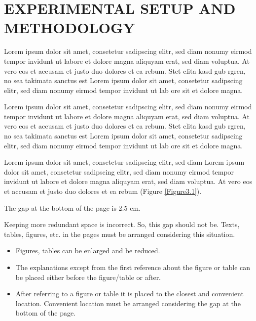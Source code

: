 \chapter{EXPERIMENTAL SETUP AND METHODOLOGY}\label{ch:Ch3}
\vspace*{-12pt} %

Lorem ipsum dolor sit amet, consetetur sadipscing elitr, sed diam nonumy eirmod tempor invidunt ut labore et dolore magna aliquyam erat, sed diam voluptua. At vero eos et accusam et justo duo dolores et ea rebum. Stet clita kasd gub rgren, no sea takimata sanctus est Lorem ipsum dolor sit amet, consetetur sadipscing elitr, sed diam nonumy eirmod tempor invidunt ut lab ore sit et dolore magna.

Lorem ipsum dolor sit amet, consetetur sadipscing elitr, sed diam nonumy eirmod tempor invidunt ut labore et dolore magna aliquyam erat, sed diam voluptua. At vero eos et accusam et justo duo dolores et ea rebum. Stet clita kasd gub rgren, no sea takimata sanctus est Lorem ipsum dolor sit amet, consetetur sadipscing elitr, sed diam nonumy eirmod tempor invidunt ut lab ore sit et dolore magna.
 

Lorem ipsum dolor sit amet, consetetur sadipscing elitr, sed diam Lorem ipsum dolor sit amet, consetetur sadipscing elitr, sed diam nonumy eirmod tempor invidunt ut labore et dolore magna aliquyam erat, sed diam voluptua. At vero eos et accusam et justo duo dolores et ea rebum (Figure \ref{Figure3.1}).

The gap at the bottom of the page is 2.5 cm. 

Keeping more redundant space is incorrect. So, this gap should not be. Texts, tables, figures, etc. in the pages must be arranged considering this situation.

\begin{itemize}
	\setlength{\itemindent}{-0.35em} %
	\item{Figures, tables can be enlarged and be reduced.}
	\vspace{-3mm}
	\item{The explanations except from the first reference about the figure or table can be placed either before the figure/table or after.}
	\vspace{-3mm}
	\item{After referring to a figure or table it is placed to the closest and convenient location. Convenient location must be arranged considering the gap at the bottom of the page.}
\end{itemize}

